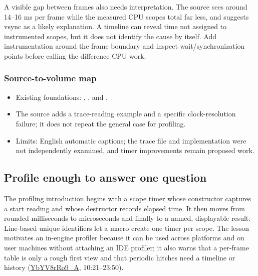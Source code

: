 A visible gap between frames also needs interpretation. The source sees around 14--16 ms per frame while the measured CPU scopes total far less, and suggests vsync as a likely explanation. A timeline can reveal time not assigned to instrumented scopes, but it does not identify the cause by itself. Add instrumentation around the frame boundary and inspect wait/synchronization points before calling the difference CPU work.

\subsubsection{Source-to-volume map}\label{06-engine-ii-ch041-source-to-volume-map-1}

\hypertarget{06-engine-ii-ch041-source-to-volume-map-1}{}

\begin{itemize}
\tightlist
\item
  Existing foundations: , , and .
\item
  The source adds a trace-reading example and a specific clock-resolution failure; it does not repeat the general case for profiling.
\item
  Limits: English automatic captions; the trace file and implementation were not independently examined, and timer improvements remain proposed work.
\end{itemize}

\subsection{Profile enough to answer one question}\label{06-engine-ii-ch041-profile-enough-to-answer-one-question}

\hypertarget{06-engine-ii-ch041-profile-enough-to-answer-one-question}{}

The profiling introduction begins with a scope timer whose constructor captures a start reading and whose destructor records elapsed time. It then moves from rounded milliseconds to microseconds and finally to a named, displayable result. Line-based unique identifiers let a macro create one timer per scope. The lesson motivates an in-engine profiler because it can be used across platforms and on user machines without attaching an IDE profiler; it also warns that a per-frame table is only a rough first view and that periodic hitches need a timeline or history (\href{https://www.youtube.com/watch?v=YbYV8rRo9_A}{YbYV8rRo9\_A}, 10:21--23:50).

